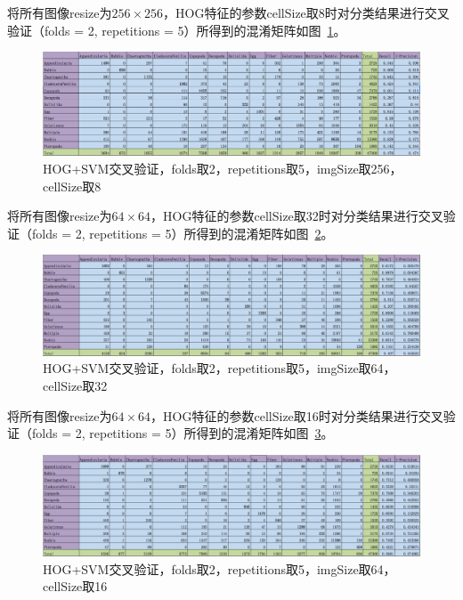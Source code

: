 \documentclass[12pt]{article}
\begin{document}
\begin{enumerate}
将所有图像resize为$256 \times 256$，HOG特征的参数cellSize取8时对分类结果进行交叉验证（folds = 2, repetitions = 5）所得到的混淆矩阵如图~\ref{fig: HOG-SVM-2-folds-5-repetitions-8-256}。
\begin{figure}[!ht]
\centering
\includegraphics[width=1.0\linewidth]{HOG-SVM-2-folds-5-repetitions-8-256}
\caption{HOG+SVM交叉验证，folds取2，repetitions取5，imgSize取256，cellSize取8}
\label{fig: HOG-SVM-2-folds-5-repetitions-8-256}
\end{figure}

将所有图像resize为$64 \times 64$，HOG特征的参数cellSize取32时对分类结果进行交叉验证（folds = 2, repetitions = 5）所得到的混淆矩阵如图~\ref{fig: HOG-SVM-2-folds-5-repetitions-32-64}。
\begin{figure}[!ht]
\centering
\includegraphics[width=1.0\linewidth]{HOG-SVM-2-folds-5-repetitions-32-64}
\caption{HOG+SVM交叉验证，folds取2，repetitions取5，imgSize取64，cellSize取32}
\label{fig: HOG-SVM-2-folds-5-repetitions-32-64}
\end{figure}

将所有图像resize为$64 \times 64$，HOG特征的参数cellSize取16时对分类结果进行交叉验证（folds = 2, repetitions = 5）所得到的混淆矩阵如图~\ref{fig: HOG-SVM-2-folds-5-repetitions-16-64}。
\begin{figure}[!ht]
\centering
\includegraphics[width=1.0\linewidth]{HOG-SVM-2-folds-5-repetitions-16-64}
\caption{HOG+SVM交叉验证，folds取2，repetitions取5，imgSize取64，cellSize取16}
\label{fig: HOG-SVM-2-folds-5-repetitions-16-64}
\end{figure}


\end{enumerate}
\end{document}
